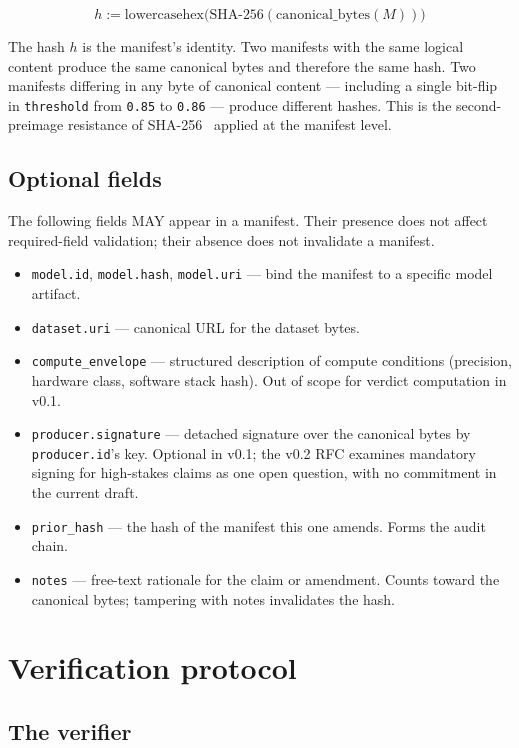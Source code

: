 \documentclass[11pt, a4paper]{article}
\begin{document}
\[
h := \mathrm{lowercasehex}\big( \mathrm{SHA\text{-}256}( \mathrm{canonical\_bytes}(M) ) \big)
\]

The hash $h$ is the manifest's identity. Two manifests with the same logical content produce the same canonical bytes and therefore the same hash. Two manifests differing in any byte of canonical content --- including a single bit-flip in \texttt{threshold} from \texttt{0.85} to \texttt{0.86} --- produce different hashes. This is the second-preimage resistance of SHA-256~\cite{nist2015fips180} applied at the manifest level.

\subsection{Optional fields}

The following fields MAY appear in a manifest. Their presence does not affect required-field validation; their absence does not invalidate a manifest.

\begin{itemize}[leftmargin=2em, itemsep=0.2em]
  \item \texttt{model.id}, \texttt{model.hash}, \texttt{model.uri} --- bind the manifest to a specific model artifact.
  \item \texttt{dataset.uri} --- canonical URL for the dataset bytes.
  \item \texttt{compute\_envelope} --- structured description of compute conditions (precision, hardware class, software stack hash). Out of scope for verdict computation in v0.1.
  \item \texttt{producer.signature} --- detached signature over the canonical bytes by \texttt{producer.id}'s key. Optional in v0.1; the v0.2 RFC examines mandatory signing for high-stakes claims as one open question, with no commitment in the current draft.
  \item \texttt{prior\_hash} --- the hash of the manifest this one amends. Forms the audit chain.
  \item \texttt{notes} --- free-text rationale for the claim or amendment. Counts toward the canonical bytes; tampering with notes invalidates the hash.
\end{itemize}

\section{Verification protocol}
\label{sec:verify}

\subsection{The verifier}
\end{document}

